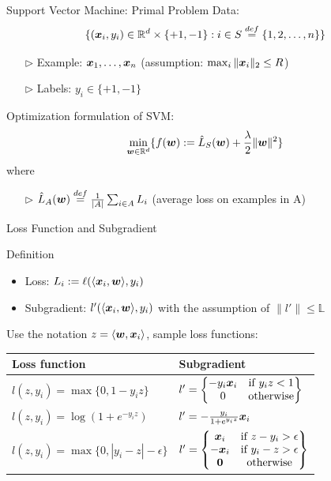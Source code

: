 \begin{frame}{Support Vector Machine: Primal Problem}
    Data: 
    \[
        \{(\bm{x}_i,y_i)\in \mathbb{R}^d \times \{+1, -1\}: i\in S \overset{def}{=} \{1,2,\ldots,n\}\}
    \]
    \begin{itemize}
        \item[$\rhd$] Example: $\bm{x}_1,\ldots,\bm{x}_n$ (assumption: $\max_i\|\bm{x}_i\|_2\le R$)
        \item[$\rhd$] Labels: $y_i \in\{+1,-1\}$
    \end{itemize}
    {\color{red} Optimization formulation of SVM:}
    \[
        \min_{\bm{w}\in\mathbb{R}^d} \{ f(\bm{w}):= \hat{L}_S(\bm{w})+\frac {\lambda} {2} \|\bm{w}\|^2 \}
    \]
    where 
    \begin{itemize}
        \item[$\rhd$] $\hat{L}_A(\bm{w}) \overset{def}{=} \frac{1}{|A|} \sum_{i\in A} L_i$ (average loss on examples in A)
    \end{itemize}
\end{frame}

\begin{frame}{Loss Function and Subgradient}
    \begin{block}{Definition}
        \begin{itemize}
            \item Loss: $L_i := \ell(\langle \bm{x}_i, \bm{w} \rangle, y_i)$

            \item Subgradient: $l'(\langle \bm{x}_i, \bm{w} \rangle, y_i)$ with the assumption of $\|l'\| \le \mathbb{L}$
        \end{itemize}
    \end{block}
    Use the notation $z=\langle \bm{w}, \bm{x}_i\rangle$, sample loss functions:
    \begin{table}[h]
        \begin{tabular}{|l|l|}
            \hline
            Loss function & Subgradient  \\ \hline
            $l(z,y_i) = \max\{0,1-y_i z\}$ & $l' = \left\{
            \begin{matrix} -y_i \bm{x}_i & \text{if } y_i z<1 \\ 
            0 & \text{otherwise}
            \end{matrix}
        \right\}$ \\ \hline
        $l(z,y_i) = \log(1+e^{-y_iz})$ & $l' = -\frac{y_i}{1+e^{y_i z}}\bm{x}_i$\\ \hline
        $l(z,y_i) = \max\{0, | y_i - z| - \epsilon\}$ & $l'=\left\{ 
        \begin{matrix}
            \bm{x}_i & \text{if } z-y_i > \epsilon \\
            -\bm{x}_i & \text{if } y_i-z > \epsilon \\
            \bm{0} & \text{otherwise}
        \end{matrix}
        \right\}$ \\ \hline
        \end{tabular}
    \end{table}
\end{frame}

